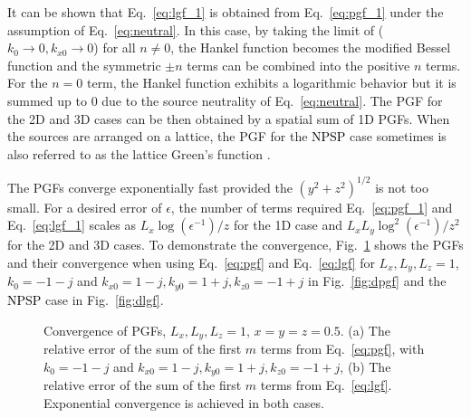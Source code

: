 \documentclass{article}
\begin{document}
It can be shown that Eq.~\eqref{eq:lgf_1} is obtained from Eq.~\eqref{eq:pgf_1} under the assumption of Eq.~\eqref{eq:neutral}. In this case, by taking the limit of ($k_0\to0, k_{x0}\to 0$) for all $n\neq 0$, the Hankel function becomes the modified Bessel function and the symmetric $\pm n$ terms can be combined into the positive $n$ terms. For the $n=0$ term, the Hankel function exhibits a logarithmic behavior but it is summed up to $0$ due to the source neutrality of Eq.~\eqref{eq:neutral}. The PGF for the 2D and 3D cases can be then obtained by a spatial sum of 1D PGFs. When the sources are arranged on a lattice, the PGF for the \textcolor{black}{NPSP} case sometimes is also referred to as the lattice Green's function \cite{LGF}.

The PGFs converge exponentially fast provided the $(y^2+z^2)^{1/2}$ is not too small. For a desired error of $\epsilon$, the number of terms required Eq.~\eqref{eq:pgf_1} and Eq.~\eqref{eq:lgf_1} scales as $L_x\log(\epsilon^{-1})/z$ for the 1D case and $L_xL_y\log^2(\epsilon^{-1})/z^2$ for the 2D and 3D cases. To demonstrate the convergence, Fig.~\ref{fig:dpgf_dlgf} shows the PGFs and their convergence when using Eq.~\eqref{eq:pgf} and Eq.~\eqref{eq:lgf} for $L_x,L_y,L_z=1$, $k_0=-1-j$ and $k_{x0}=1-j, k_{y0}=1+j, k_{z0}=-1+j$ in Fig.~\ref{fig:dpgf} and the \textcolor{black}{NPSP} case in Fig.~\ref{fig:dlgf}.

\begin{figure}[htbp]
    \quad
    \caption{Convergence of PGFs, $L_x,L_y,L_z=1$, $x=y=z=0.5$. (a) The relative error of the sum of the first $m$ terms from Eq.~\eqref{eq:pgf}, with $k_0=-1-j$ and $k_{x0}=1-j, k_{y0}=1+j, k_{z0}=-1+j$, (b) The relative error of the sum of the first $m$ terms from Eq.~\eqref{eq:lgf}. Exponential convergence is achieved in both cases.}
    \label{fig:dpgf_dlgf}
\end{figure}
\end{document}
